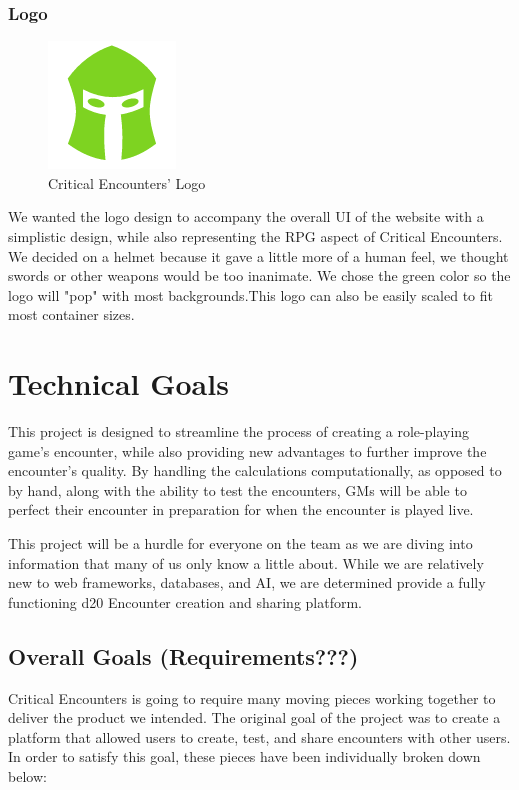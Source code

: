 \documentclass[12pt,a4paper]{report}
\begin{document}
	\subsection {Logo}
	\begin{figure}
		\includegraphics[scale=.5]{logo-large}
		\caption{Critical Encounters' Logo}
		\label{fig: Critical Encounters' Logo}
	\end{figure}
	We wanted the logo design to accompany the overall UI of the website with a simplistic design, while also representing the RPG aspect of Critical Encounters. We decided on a helmet because it gave a little more of a human feel, we thought swords or other weapons would be too inanimate. We chose the green color so the logo will "pop" with most backgrounds.This logo can also be easily scaled to fit most container sizes.
\newpage
\chapter*{Technical Goals}
This project is designed to streamline the process of creating a role-playing game's encounter, while also providing new advantages to further improve the encounter's quality. By handling the calculations computationally, as opposed to by hand, along with the ability to test the encounters, GMs will be able to perfect their encounter in preparation for when the encounter is played live.

This project will be a hurdle for everyone on the team as we are diving into information that many of us only know a little about. While we are relatively new to web frameworks, databases, and AI, we are determined provide a fully functioning d20 Encounter creation and sharing platform.
	\section{Overall Goals (Requirements???)}
	Critical Encounters is going to require many moving pieces working together to deliver the product we intended. The original goal of the project was to create a platform that allowed users to create, test, and share encounters with other users. In order to satisfy this goal, these pieces have been individually broken down below:
\end{document}
